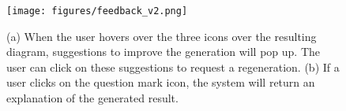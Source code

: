 
\begin{figure}[ht]
\centering
\texttt{[image: figures/feedback\_v2.png]}
\caption{(a) When the user hovers over the three icons over the resulting diagram, suggestions to improve the generation will pop up. The user can click on these suggestions to request a regeneration. (b) If a user clicks on the question mark icon, the system will return an explanation of the generated result.}
\label{fig:feedback}
\end{figure}